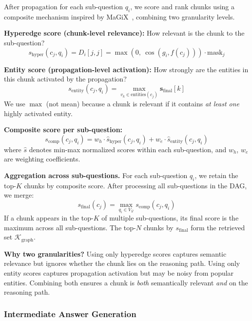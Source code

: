 \documentclass[11pt,a4paper]{article}
\begin{document}
After propagation for each sub-question $q_i$, we score and rank chunks using a composite mechanism inspired by MaGiX~\cite{hieu2025magix}, combining two granularity levels.

\textbf{Hyperedge score (chunk-level relevance):} How relevant is the chunk to the sub-question?
\begin{equation}
    s_{\text{hyper}}(c_j, q_i) = D_i[j,j] = \max(0,\ \cos(g_i, f(c_j))) \cdot \text{mask}_j
\end{equation}

\textbf{Entity score (propagation-level activation):} How strongly are the entities in this chunk activated by the propagation?
\begin{equation}
    s_{\text{entity}}(c_j, q_i) = \max_{v_k \in \text{entities}(c_j)} \mathbf{s}_{\text{final}}[k]
\end{equation}
We use $\max$ (not mean) because a chunk is relevant if it contains \textit{at least one} highly activated entity.

\textbf{Composite score per sub-question:}
\begin{equation}
    s_{\text{comp}}(c_j, q_i) = w_h \cdot \hat{s}_{\text{hyper}}(c_j, q_i) + w_e \cdot \hat{s}_{\text{entity}}(c_j, q_i)
\end{equation}
where $\hat{s}$ denotes min-max normalized scores within each sub-question, and $w_h$, $w_e$ are weighting coefficients.

\textbf{Aggregation across sub-questions.} For each sub-question $q_i$, we retain the top-$K$ chunks by composite score. After processing all sub-questions in the DAG, we merge:
\begin{equation}
    s_{\text{final}}(c_j) = \max_{q_i \in V_\mathcal{Q}} s_{\text{comp}}(c_j, q_i)
\end{equation}
If a chunk appears in the top-$K$ of multiple sub-questions, its final score is the maximum across all sub-questions. The top-$N$ chunks by $s_{\text{final}}$ form the retrieved set $\mathcal{K}_{\text{graph}}$.

\textbf{Why two granularities?} Using only hyperedge scores captures semantic relevance but ignores whether the chunk lies on the reasoning path. Using only entity scores captures propagation activation but may be noisy from popular entities. Combining both ensures a chunk is \textit{both} semantically relevant \textit{and} on the reasoning path.

\subsubsection{Intermediate Answer Generation}
\end{document}
